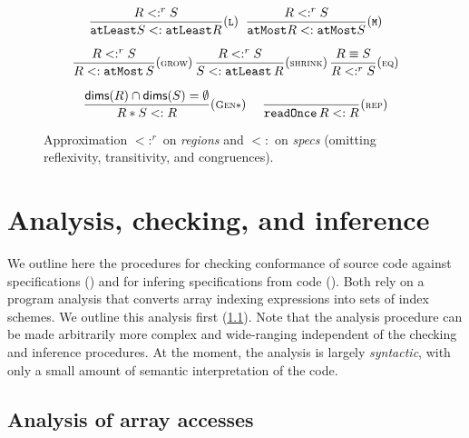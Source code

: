 \documentclass[10pt,preprint,numbers]{sigplanconf}
\theoremstyle{definition}
\newcommand{\term}[1]{\texttt{#1}}
\newcommand{\trule}[1]{{\footnotesize{(\text{#1})}}}
\begin{document}
\begin{figure}[t]
\begin{align*}
{{\begin{array}{c}
%
%
\dfrac{R <:^r S}{\term{atLeast}  S <: \term{atLeast}
  R}\trule{\texttt{L}}
\;\;
\dfrac{R <:^r S}{\term{atMost}  R <: \term{atMost}
  S}\trule{\texttt{M}} \\[1.5em]
\dfrac{R <:^r S}{R <: \term{atMost} \, S}\trule{\textsc{grow}} \,
\dfrac{R <:^r S}{S <: \term{atLeast} \, R}\trule{\textsc{shrink}} \,
\dfrac{R \equiv S}{R <:^r S}\trule{\textsc{eq}}
 \\[1.5em]
\dfrac{\mathsf{dims}(R) \cap \mathsf{dims}(S) = \emptyset}{R \ast S <: R}
\trule{\textsc{Gen$\ast$}}
\quad
\;
\dfrac{}{\term{readOnce} \, R <: R}\trule{\textsc{rep}}
\end{array}}}
\end{align*}
\vspace{-0.5em}
\caption{Approximation $<:^r$ on \textit{regions} and
$<:$ on \textit{specs} (omitting reflexivity, transitivity, and congruences). }
\label{fig:inequations}
\vspace{-0.5em}
\end{figure}

\section{Analysis, checking, and inference}
\label{sec:analysis}

\noindent
We outline here the procedures for checking conformance
of source code against specifications ()
and for infering specifications from code ().
Both rely on a program analysis that converts array indexing
expressions into sets of index schemes. We outline this analysis
first (\cref{subsec:analysis}). Note that the analysis procedure
can be made arbitrarily more complex and wide-ranging independent
of the checking and inference procedures. At the moment, the analysis
is largely \emph{syntactic}, with only a small amount of
semantic interpretation of the code.

\subsection{Analysis of array accesses}
\label{subsec:analysis}
\end{document}
